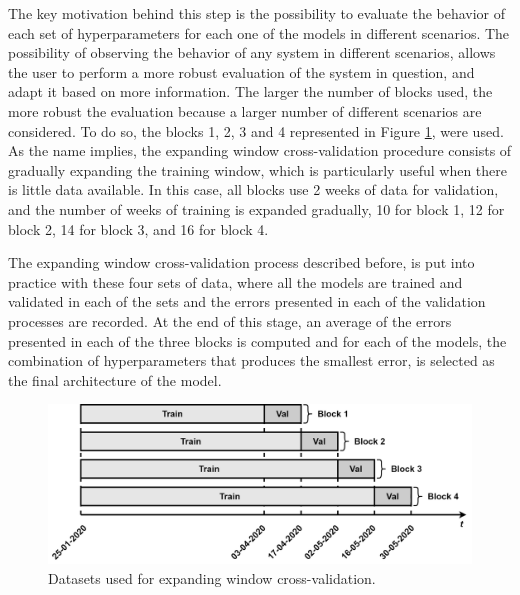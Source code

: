 The key motivation behind this step is the possibility to evaluate the behavior of each set of hyperparameters for each one of the models in different scenarios. The possibility of observing the behavior of any system in different scenarios, allows the user to perform a more robust evaluation of the system in question, and adapt it based on more information. The larger the number of blocks used, the more robust the evaluation because a larger number of different scenarios are considered. To do so, the blocks 1, 2, 3 and 4 represented in Figure \ref{hyptun}, were used. As the name implies, the expanding window cross-validation procedure consists of gradually expanding the training window, which is particularly useful when there is little data available. In this case, all blocks use 2 weeks of data for validation, and the number of weeks of training is expanded gradually, 10 for block 1, 12 for block 2, 14 for block 3, and 16 for block 4.

The expanding window cross-validation process described before, is put into practice with these four sets of data, where all the models are trained and validated in each of the sets and the errors presented in each of the validation processes are recorded. At the end of this stage, an average of the errors presented in each of the three blocks is computed and for each of the models, the combination of hyperparameters that produces the smallest error, is selected as the final architecture of the model. 

\begin{figure}[h!]
    \centering
    \begin{center}
    \includegraphics[width=1\textwidth]{Images/hyptun.png}
    \caption{Datasets used for expanding window cross-validation.}
    \label{hyptun}
    \end{center}
\end{figure}

